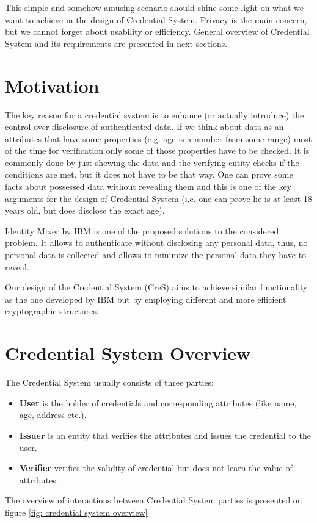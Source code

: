 This simple and somehow amusing scenario should shine some light on what we want to achieve in the design of Credential System. Privacy is the main concern, but we cannot forget about usability or efficiency. General overview of Credential System and its requirements are presented in next sections.

\clearpage

\section{Motivation}

The key reason for a credential system is to enhance (or actually introduce) the control over disclosure of authenticated data.
If we think about data as an attributes that have some properties (e.g. age is a number from some range) most of the time for verification only some of those properties have to be checked. It is commonly done by just showing the data and the verifying entity checks if the conditions are met, but it does not have to be that way. One can prove some facts about possessed data without revealing them and this is one of the key arguments for the design of Credential System (i.e. one can prove he is at least 18 years old, but does disclose the exact age).

Identity Mixer \cite{idemix} by IBM is one of the proposed solutions to the considered problem. It allows to authenticate without disclosing any personal data, thus, no personal data is collected and allows to minimize the personal data they have to reveal.

Our design of the Credential System (CreS) aims to achieve similar functionality as the one developed by IBM but by employing different and more efficient cryptographic structures. 

\section{Credential System Overview}

The Credential System usually consists of three parties:
\begin{itemize}
    \item \textbf{User} is the holder of credentials and corresponding attributes (like name, age, address etc.).
    \item \textbf{Issuer} is an entity that verifies the attributes and issues the credential to the user.
    \item \textbf{Verifier} verifies the validity of credential but does not learn the value of attributes. 
\end{itemize}
The overview of interactions between Credential System parties is presented on figure \ref{fig: credential system overview} %

